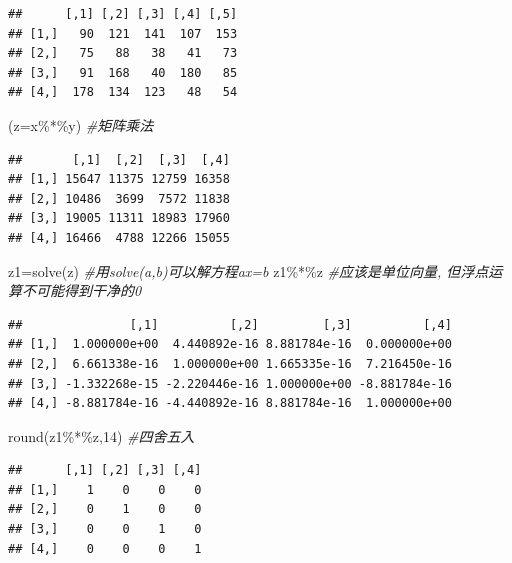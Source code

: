 \documentclass[
]{book}
\newenvironment{Shaded}{\begin{snugshade}}{\end{snugshade}}
\newcommand{\AttributeTok}[1]{\textcolor[rgb]{0.77,0.63,0.00}{#1}}
\newcommand{\CommentTok}[1]{\textcolor[rgb]{0.56,0.35,0.01}{\textit{#1}}}
\newcommand{\DecValTok}[1]{\textcolor[rgb]{0.00,0.00,0.81}{#1}}
\newcommand{\FunctionTok}[1]{\textcolor[rgb]{0.00,0.00,0.00}{#1}}
\newcommand{\NormalTok}[1]{#1}
\newcommand{\OtherTok}[1]{\textcolor[rgb]{0.56,0.35,0.01}{#1}}
\newcommand{\SpecialCharTok}[1]{\textcolor[rgb]{0.00,0.00,0.00}{#1}}
\begin{document}
\begin{verbatim}
##      [,1] [,2] [,3] [,4] [,5]
## [1,]   90  121  141  107  153
## [2,]   75   88   38   41   73
## [3,]   91  168   40  180   85
## [4,]  178  134  123   48   54
\end{verbatim}

\begin{Shaded}
\begin{Highlighting}[]
\NormalTok{(}\AttributeTok{z=}\NormalTok{x}\SpecialCharTok{\%*\%}\NormalTok{y) }\CommentTok{\#矩阵乘法}
\end{Highlighting}
\end{Shaded}

\begin{verbatim}
##       [,1]  [,2]  [,3]  [,4]
## [1,] 15647 11375 12759 16358
## [2,] 10486  3699  7572 11838
## [3,] 19005 11311 18983 17960
## [4,] 16466  4788 12266 15055
\end{verbatim}

\begin{Shaded}
\begin{Highlighting}[]
\NormalTok{z1}\OtherTok{=}\FunctionTok{solve}\NormalTok{(z) }\CommentTok{\#用solve(a,b)可以解方程ax=b}
\NormalTok{z1}\SpecialCharTok{\%*\%}\NormalTok{z }\CommentTok{\#应该是单位向量, 但浮点运算不可能得到干净的0}
\end{Highlighting}
\end{Shaded}

\begin{verbatim}
##               [,1]          [,2]         [,3]          [,4]
## [1,]  1.000000e+00  4.440892e-16 8.881784e-16  0.000000e+00
## [2,]  6.661338e-16  1.000000e+00 1.665335e-16  7.216450e-16
## [3,] -1.332268e-15 -2.220446e-16 1.000000e+00 -8.881784e-16
## [4,] -8.881784e-16 -4.440892e-16 8.881784e-16  1.000000e+00
\end{verbatim}

\begin{Shaded}
\begin{Highlighting}[]
\FunctionTok{round}\NormalTok{(z1}\SpecialCharTok{\%*\%}\NormalTok{z,}\DecValTok{14}\NormalTok{)  }\CommentTok{\#四舍五入}
\end{Highlighting}
\end{Shaded}

\begin{verbatim}
##      [,1] [,2] [,3] [,4]
## [1,]    1    0    0    0
## [2,]    0    1    0    0
## [3,]    0    0    1    0
## [4,]    0    0    0    1
\end{verbatim}
\end{document}
